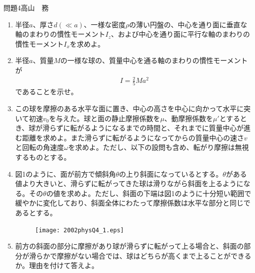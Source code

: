 \documentclass[fleqn]{jbook}
\begin{document}
\begin{question}{問題4}{高山　務}
\begin{enumerate}
\item
半径$a$、厚さ$d(\ll a)$、一様な密度$\rho$の薄い円盤の、中心を通り面に垂直な軸のまわりの慣性モーメント$I_z$、および中心を通り面に平行な軸のまわりの慣性モーメント$I_x$を求めよ。
\item
半径$a$、質量$M$の一様な球の、質量中心を通る軸のまわりの慣性モーメントが
\begin{eqnarray}
I=\frac{2}{5}Ma^2
\end{eqnarray}
であることを示せ。
\item
この球を摩擦のある水平な面に置き、中心の高さを中心に向かって水平に突いて初速$v_0$を与えた。球と面の静止摩擦係数を$\mu$、動摩擦係数を$\mu'$とするとき、球が滑らずに転がるようになるまでの時間と、それまでに質量中心が進む距離を求めよ。また滑らずに転がるようになってからの質量中心の速さ$v$と回転の角速度$\omega$を求めよ。ただし、以下の設問も含め、転がり摩擦は無視するものとする。
\item
図1のように、面が前方で傾斜角$\theta$の上り斜面になっているとする。$\theta$がある値より大きいと、滑らずに転がってきた球は滑りながら斜面を上るようになる。その$\theta$の値を求めよ。ただし、斜面の下端は図1のように十分短い範囲で緩やかに変化しており、斜面全体にわたって摩擦係数は水平な部分と同じであるとする。
\begin{figure}[htbp]
\begin{center}
\texttt{[image: 2002physQ4\_1.eps]}
\end{center}
\end{figure}
\item
前方の斜面の部分に摩擦があり球が滑らずに転がって上る場合と、斜面の部分が滑らかで摩擦がない場合では、球はどちらが高くまで上ることができるか。理由を付けて答えよ。
\end{enumerate}
\end{question}
\end{document}

